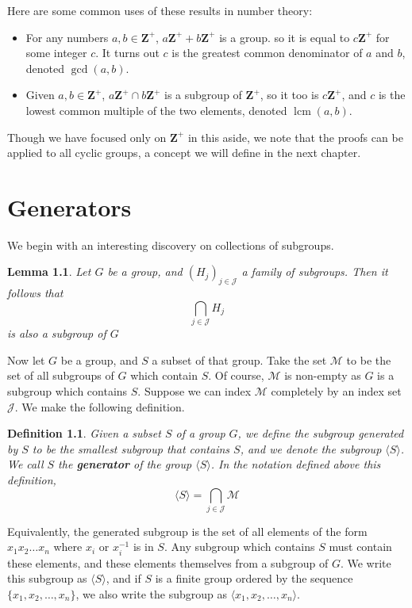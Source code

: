 \documentclass[12pt]{report}
\newtheorem{lemma}[theorem]{Lemma}
\newtheorem{definition}{Definition}
\DeclareMathOperator{\lcm}{lcm}
\begin{document}
Here are some common uses of these results in number theory:
\begin{itemize}
    \item For any numbers $a, b \in \mathbf{Z}^+$, $a\mathbf{Z}^+ + b\mathbf{Z}^+$ is a group. so it is equal to $c\mathbf{Z}^+$ for some integer $c$. It turns out $c$ is the greatest common denominator of $a$ and $b$, denoted $\gcd(a,b)$.
    \item Given $a,b \in \mathbf{Z}^+$, $a\mathbf{Z}^+ \cap b\mathbf{Z}^+$ is a subgroup of $\mathbf{Z}^+$, so it too is $c\mathbf{Z}^+$, and $c$ is the lowest common multiple of the two elements, denoted $\lcm(a,b)$.
\end{itemize}

Though we have focused only on $\mathbf{Z}^+$ in this aside, we note that the proofs can be applied to all cyclic groups, a concept we will define in the next chapter.

\chapter{Generators}

We begin with an interesting discovery on collections of subgroups.

\begin{lemma}
    Let $G$ be a group, and $(H_j)_{j \in \mathcal{J}}$ a family of subgroups. Then it follows that
    \[ \bigcap_{j \in \mathcal{J}} H_j \]
    is also a subgroup of $G$
\end{lemma}

Now let $G$ be a group, and $S$ a subset of that group. Take the set $\mathcal{M}$ to be the set of all subgroups of $G$ which contain $S$. Of course, $\mathcal{M}$ is non-empty as $G$ is a subgroup which contains $S$. Suppose we can index $\mathcal{M}$ completely by an index set $\mathcal{J}$. We make the following definition.

\begin{definition}
    Given a subset $S$ of a group $G$, we define the subgroup generated by $S$ to be the smallest subgroup that contains $S$, and we denote the subgroup $\langle S \rangle$. We call $S$ the {\bf generator} of the group $\langle S \rangle$. In the notation defined above this definition,
    \[ \langle S \rangle = \bigcap_{j \in \mathcal{J}} \mathcal{M} \]
\end{definition}

Equivalently, the generated subgroup is the set of all elements of the form $x_1 x_2 \dots x_n$ where $x_i$ or $x_i^{-1}$ is in $S$. Any subgroup which contains $S$ must contain these elements, and these elements themselves from a subgroup of $G$. We write this subgroup as $\langle S \rangle$, and if $S$ is a finite group ordered by the sequence $\{ x_1, x_2, \dots, x_n \}$, we also write the subgroup as $\langle x_1, x_2, \dots, x_n \rangle$.
\end{document}
